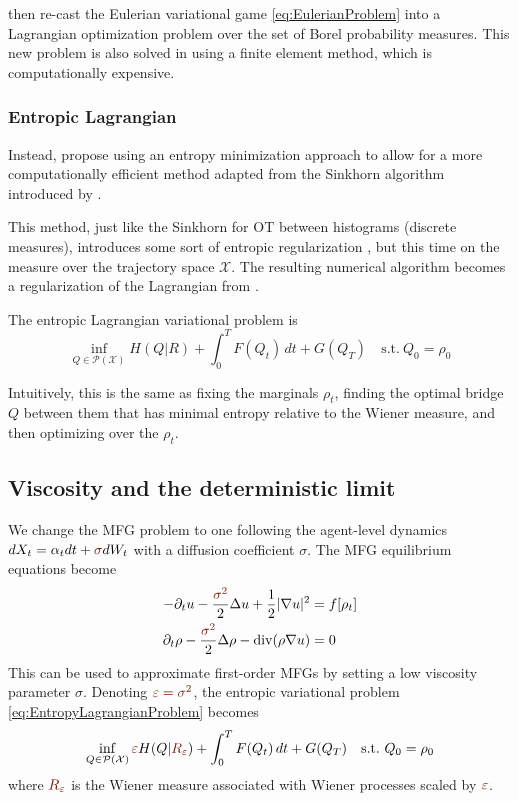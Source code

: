 \documentclass{article}
\newcommand{\calP}{\mathcal{P}}
\newcommand{\calX}{\mathcal{X}}
\newcommand{\suchthat}{\mathrm{s.t.}}
\renewcommand{\epsilon}{\varepsilon}
\DeclareMathOperator{\divg}{div}
\numberwithin{equation}{section}
\theoremstyle{definition}
\begin{document}
\textcite{benamou:hal-01295299,benamou2015lagrangian} then re-cast the Eulerian variational game \eqref{eq:EulerianProblem} into a Lagrangian optimization problem over the set of Borel probability measures. This new problem is also solved in \cite{benamou:hal-01295299} using a finite element method, which is computationally expensive.




\subsubsection{Entropic Lagrangian}

Instead, \textcite{benamou2018entropy} propose using an entropy minimization approach to allow for a more computationally efficient method adapted from the Sinkhorn algorithm introduced by \textcite{cuturi2013sinkhorn}.

This method, just like the Sinkhorn for OT between histograms (discrete measures), introduces some sort of entropic regularization \cite{benamou2018entropy}, but this time on the measure over the trajectory space $\calX$. The resulting numerical algorithm becomes a regularization of the Lagrangian from \cite{benamou:hal-01295299,benamou2015lagrangian}.

The entropic Lagrangian variational problem is
\begin{equation}\label{eq:EntropyLagrangianProblem}
\inf_{Q\in\calP(\calX)}
H(Q|R) + \int_0^T F(Q_t)\,dt + G(Q_T) \quad
\suchthat\ Q_0 = \rho_0
\end{equation}

Intuitively, this is the same as fixing the marginals $\rho_t$, finding the optimal bridge $Q$ between them that has minimal entropy relative to the Wiener measure, and then optimizing over the $\rho_t$.


\subsection{Viscosity and the deterministic limit}

We change the MFG problem to one following the agent-level dynamics $dX_t = \alpha_t dt + {\color{Brown}\sigma} dW_t$ with a diffusion coefficient $\sigma$. The MFG equilibrium equations become
\begin{equation}
\begin{aligned}
	-\partial_t u - \frac{\color{Brown}\sigma^2}{2}\Delta u + \frac12 |\nabla u|^2 &= f[\rho_t] \\
	\partial_t \rho - \frac{\color{Brown}\sigma^2}{2}\Delta\rho - \divg(\rho\nabla u) &= 0
\end{aligned}	
\end{equation}
This can be used to approximate first-order MFGs by setting a low viscosity parameter $\sigma$.
Denoting $\color{Brown}\epsilon = \sigma^2$, the entropic variational problem \eqref{eq:EntropyLagrangianProblem} becomes
\[
	\inf_{Q\in\calP(\calX)}
	{\color{Brown}\epsilon} H(Q|{\color{Brown}R_{\epsilon}}) + \int_0^T F(Q_t)\,dt + G(Q_T)\quad
	\suchthat\ Q_0 = \rho_0
\]
where $\color{Brown}R_{\epsilon}$ is the Wiener measure associated with Wiener processes scaled by $\color{Brown}\epsilon$.
\end{document}
